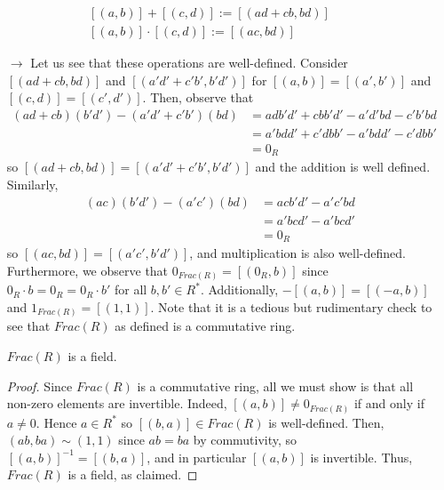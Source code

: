 \begin{construction}
\begin{enumerate}
\begin{equation}
            \begin{array}{l}
                [(a,b)] + [(c,d)] := [(ad+cb,bd)] \\
                {[(a,b)]}\cdot [(c,d)] := [(ac,bd)] 
            \end{array}
        \end{equation}
    \end{enumerate}
    \begin{enumerate}
        \item[$\rightarrow$] Let us see that these operations are well-defined. Consider $[(ad+cb,bd)]$ and $[(a'd'+c'b',b'd')]$ for $[(a,b)] = [(a',b')]$ and $[(c,d)] = [(c',d')]$. Then, observe that \begin{align*}
            (ad+cb)(b'd') - (a'd'+c'b')(bd) &= adb'd'+cbb'd' - a'd'bd - c'b'bd \\
            &= a'bdd' + c'dbb' - a'bdd' - c'dbb' \\
            &= 0_R
        \end{align*}
        so $[(ad+cb,bd)]=[(a'd'+c'b',b'd')]$ and the addition is well defined. Similarly, \begin{align*}
            (ac)(b'd')-(a'c')(bd) &= acb'd'-a'c'bd \\
            &= a'bcd' - a'bcd' \\
            &= 0_R
        \end{align*}
        so $[(ac,bd)] = [(a'c',b'd')]$, and multiplication is also well-defined. Furthermore, we observe that $0_{Frac(R)} = [(0_R,b)]$ since $0_R\cdot b = 0_R = 0_R \cdot b'$ for all $b,b' \in R^*$. Additionally, $-[(a,b)] = [(-a,b)]$ and $1_{Frac(R)} = [(1,1)]$. Note that it is a tedious but rudimentary check to see that $Frac(R)$ as defined is a commutative ring.
        \begin{claim}
            $Frac(R)$ is a field.
            \begin{proof}
                    Since $Frac(R)$ is a commutative ring, all we must show is that all non-zero elements are invertible. Indeed, $[(a,b)] \neq 0_{Frac(R)}$ if and only if $a \neq 0$. Hence $a \in R^*$ so $[(b,a)] \in Frac(R)$ is well-defined. Then, $(ab,ba) \sim (1,1)$ since $ab = ba$  by commutivity, so $[(a,b)]^{-1} = [(b,a)]$, and in particular $[(a,b)]$ is invertible. Thus, $Frac(R)$ is a field, as claimed.
            \end{proof}
        \end{claim}
    \end{enumerate}
\end{construction}

